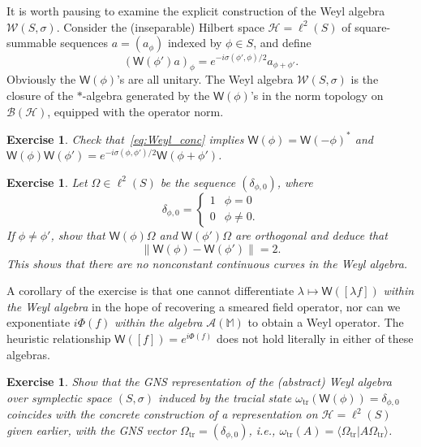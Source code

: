 \documentclass[12pt,a4paper]{article}
\newcommand{\1}{\mathds{1}}                         %
\newcommand{\Hcal}{\mathcal {H}}
\newcommand{\MM}{\mathbb{M}}
\newcommand{\BB}{{\mathcal{B}}}
\newcommand{\HH}{{\mathcal{H}}}
\newcommand{\Ac}{{\mathcal{A}}}
\newcommand{\Wc}{{\mathcal{W}}}
\newcommand{\Ws}{{\mathsf{W}}}
\newcommand{\ip}[2]{\langle #1|#2\rangle}
\newtheorem{exercise}[theorem]{Exercise}
\begin{document}
	It is worth pausing to examine the explicit construction of the Weyl algebra $\Wc(S,\sigma)$.  Consider
	the (inseparable) Hilbert space $\HH=\ell^2(S)$
	of square-summable sequences $a=(a_\phi)$ indexed by $\phi\in S$, and define
	\begin{equation}\label{eq:Weyl_conc}
	(\Ws(\phi')a)_\phi = e^{-i\sigma(\phi',\phi)/2} a_{\phi+\phi'}.
	\end{equation}
	Obviously the $\Ws(\phi)$'s are all unitary. 
	The Weyl algebra $\Wc(S,\sigma)$ is the closure of the $*$-algebra generated by the $\Ws(\phi)$'s in the norm topology on $\BB(\HH)$, equipped with the operator norm.
	

	\begin{exercise}
		Check that~\eqref{eq:Weyl_conc} implies $\Ws(\phi)=\Ws(-\phi)^*$ and $\Ws(\phi)\Ws(\phi') = e^{-i\sigma(\phi,\phi')/2}\Ws(\phi+\phi')$.
	\end{exercise} 
	\begin{exercise}
		Let $\Omega\in\ell^2(S)$ be the sequence $(\delta_{\phi,0})$, where
		\[
		\delta_{\phi,0}= \begin{cases}
		1 & \phi=0\\ 0 & \phi\neq 0.
		\end{cases} 
		\]
		If $\phi\neq\phi'$, show that
		$\Ws(\phi)\Omega$ and $\Ws(\phi')\Omega$ are orthogonal and deduce that 
		\[
		\|\Ws(\phi)-\Ws(\phi')\| =2.
		\]
		This shows that there are no nonconstant continuous curves in the Weyl algebra.
	\end{exercise}
	A corollary of the exercise is that one cannot differentiate $\lambda\mapsto \Ws([\lambda f])$ \emph{within the Weyl algebra} in the hope of recovering a smeared field operator, nor can we exponentiate $i\Phi(f)$ \emph{within the algebra $\Ac(\MM)$} to obtain a Weyl operator. The heuristic relationship 
	$\Ws([f]) = e^{i\Phi(f)}$ does not hold literally in either of these algebras. 
\begin{exercise}
		Show that the GNS representation of the (abstract) Weyl algebra over symplectic space $(S,\sigma)$ induced by the \emph{tracial state} $\omega_{\text{tr}}(\Ws(\phi)) = \delta_{\phi,0}$ 
		coincides with the concrete construction of a representation on $\Hcal=\ell^2(S)$
		given earlier, with the GNS vector   $\Omega_{\text{tr}}=(\delta_{\phi,0})$,  i.e., $\omega_{\text{tr}}(A)=\ip{\Omega_{\text{tr}}}{A\Omega_{\text{tr}}}$. 
	\end{exercise}
	
\end{document}

